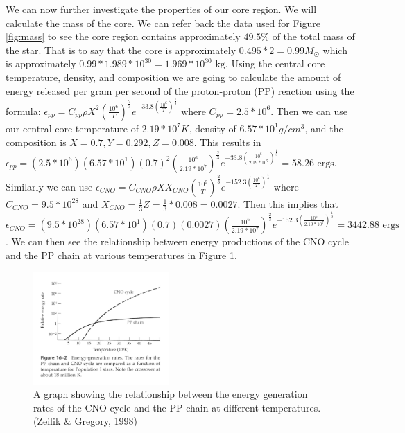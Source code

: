 \documentclass{article}
\begin{document}
\begin{multicols}{2}

We can now further investigate the properties of our core region. We will calculate the mass of the core. We can refer back the data used for Figure \ref{fig:mass} to see the core region contains approximately $49.5\%$ of the total mass of the star. That is to say that the core is approximately $0.495*2 = 0.99M_\odot$ which is approximately $0.99*1.989*10^30 = 1.969*10^{30}\text{ kg}$. Using the central core temperature, density, and composition we are going to calculate the amount of energy released per gram per second of the proton-proton (PP) reaction using the formula: $\epsilon_{pp} = C_{pp}\rho X^2 (\frac{10^6}{T})^\frac{2}{3}e^{-33.8(\frac{10^6}{T})^\frac{1}{3}}$ where $C_{pp} = 2.5*10^6$. Then we can use our central core temperature of $2.19*10^7K$, density of $6.57*10^1 g/cm^3$, and the composition is $X=0.7, Y=0.292, Z=0.008$. This results in $\epsilon_{pp} = (2.5*10^6)(6.57*10^1)(0.7)^2(\frac{10^6}{2.19*10^7})^{\frac{2}{3}}e^{-33.8(\frac{10^6}{2.19*10^7})^{\frac{1}{3}}} = 58.26\text{ ergs}$. Similarly we can use $\epsilon_{CNO} = C_{CNO}\rho XX_{CNO}(\frac{10^6}{T})^{\frac{2}{3}}e^{-152.3(\frac{10^6}{T})^{\frac{1}{3}}}$ where $C_{CNO} = 9.5*10^{28}$ and $X_{CNO} = \frac{1}{3}Z = \frac{1}{3}*0.008 = 0.0027$. Then this implies that $\epsilon_{CNO} = (9.5*10^{28})(6.57*10^1)(0.7)(0.0027)(\frac{10^6}{2.19*10^7})^\frac{2}{3}e^{-152.3(\frac{10^6}{2.19*10^7})^{\frac{1}{3}}} = 3442.88\text{ ergs}$. We can then see the relationship between energy productions of the CNO cycle and the PP chain at various temperatures in Figure \ref{fig:energyrate}.

\end{multicols}

\begin{figure}
  \centering
  \includegraphics[width=0.46\textwidth]{Energy_Rates.jpg}
  \caption{A graph showing the relationship between the energy generation rates of the CNO cycle and the PP chain at different temperatures. (Zeilik \& Gregory, 1998)}
  \label{fig:energyrate}
\end{figure}
\end{document}
